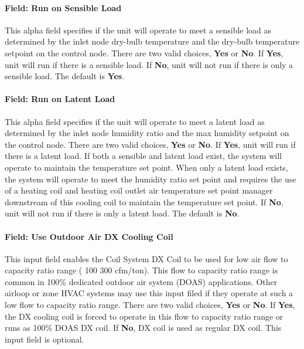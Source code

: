 \paragraph{Field: Run on Sensible Load}\label{field-run-on-sensible-load}

This alpha field specifies if the unit will operate to meet a sensible load as determined by the inlet node dry-bulb temperature and the dry-bulb temperature setpoint on the control node. There are two valid choices, \textbf{Yes} or \textbf{No}. If \textbf{Yes}, unit will run if there is a sensible load. If \textbf{No}, unit will not run if there is only a sensible load. The default is \textbf{Yes}.

\paragraph{Field: Run on Latent Load}\label{field-run-on-latent-load}

This alpha field specifies if the unit will operate to meet a latent load as determined by the inlet node humidity ratio and the max humidity setpoint on the control node. There are two valid choices, \textbf{Yes} or \textbf{No}. If \textbf{Yes}, unit will run if there is a latent load. If both a sensible and latent load exist, the system will operate to maintain the temperature set point. When only a latent load exists, the system will operate to meet the humidity ratio set point and requires the use of a heating coil and heating coil outlet air temperature set point manager downstream of this cooling coil to maintain the temperature set point. If \textbf{No}, unit will not run if there is only a latent load. The default is \textbf{No}.

\paragraph{Field: Use Outdoor Air DX Cooling Coil}\label{field-use-outdoor-air-dx-cooling-coil}

This input field enables the Coil System DX Coil to be used for low air flow to capacity ratio range ( 100 300 cfm/ton). This flow to capacity ratio range is common in 100\% dedicated outdoor air system (DOAS) applications. Other airloop or zone HVAC systems may use this input filed if they operate at such a low flow to capacity ratio range. There are two valid choices, \textbf{Yes} or \textbf{No}. If \textbf{Yes}, the DX cooling coil is forced to operate in this flow to capacity ratio range or runs as 100\% DOAS DX coil. If \textbf{No}, DX coil is used as regular DX coil. This input field is optional.

